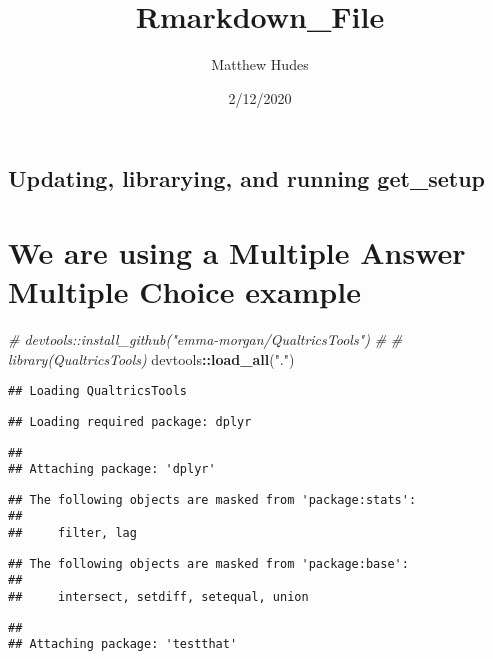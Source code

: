 \documentclass[
]{article}
\title{Rmarkdown\_File}
\author{Matthew Hudes}
\date{2/12/2020}
\newenvironment{Shaded}{\begin{snugshade}}{\end{snugshade}}
\newcommand{\CommentTok}[1]{\textcolor[rgb]{0.56,0.35,0.01}{\textit{#1}}}
\newcommand{\KeywordTok}[1]{\textcolor[rgb]{0.13,0.29,0.53}{\textbf{#1}}}
\newcommand{\NormalTok}[1]{#1}
\newcommand{\OperatorTok}[1]{\textcolor[rgb]{0.81,0.36,0.00}{\textbf{#1}}}
\newcommand{\StringTok}[1]{\textcolor[rgb]{0.31,0.60,0.02}{#1}}
\begin{document}
\maketitle

\hypertarget{updating-librarying-and-running-get_setup}{%
\subsection{Updating, librarying, and running
get\_setup}\label{updating-librarying-and-running-get_setup}}

\hypertarget{we-are-using-a-multiple-answer-multiple-choice-example}{%
\section{We are using a Multiple Answer Multiple Choice
example}\label{we-are-using-a-multiple-answer-multiple-choice-example}}

\begin{Shaded}
\begin{Highlighting}[]
\CommentTok{# devtools::install_github("emma-morgan/QualtricsTools")}
\CommentTok{# }
\CommentTok{# library(QualtricsTools)}
\NormalTok{devtools}\OperatorTok{::}\KeywordTok{load_all}\NormalTok{(}\StringTok{"."}\NormalTok{)}
\end{Highlighting}
\end{Shaded}

\begin{verbatim}
## Loading QualtricsTools
\end{verbatim}

\begin{verbatim}
## Loading required package: dplyr
\end{verbatim}

\begin{verbatim}
## 
## Attaching package: 'dplyr'
\end{verbatim}

\begin{verbatim}
## The following objects are masked from 'package:stats':
## 
##     filter, lag
\end{verbatim}

\begin{verbatim}
## The following objects are masked from 'package:base':
## 
##     intersect, setdiff, setequal, union
\end{verbatim}

\begin{verbatim}
## 
## Attaching package: 'testthat'
\end{verbatim}
\end{document}
